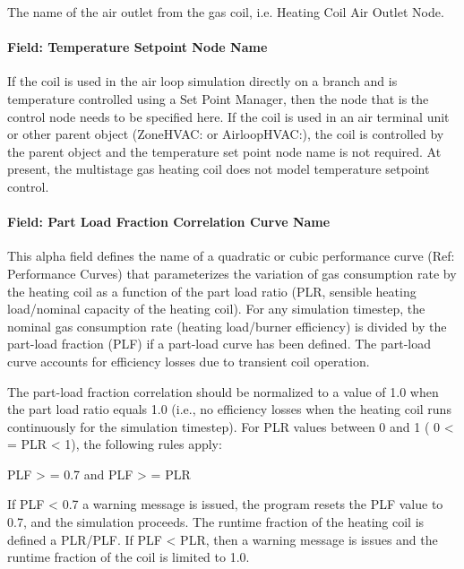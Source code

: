 The name of the air outlet from the gas coil, i.e. Heating Coil Air Outlet Node.

\paragraph{Field: Temperature Setpoint Node Name}\label{field-temperature-setpoint-node-name-5}

If the coil is used in the air loop simulation directly on a branch and is temperature controlled using a Set Point Manager, then the node that is the control node needs to be specified here. If the coil is used in an air terminal unit or other parent object (ZoneHVAC: or AirloopHVAC:), the coil is controlled by the parent object and the temperature set point node name is not required. At present, the multistage gas heating coil does not model temperature setpoint control.

\paragraph{Field: Part Load Fraction Correlation Curve Name}\label{field-part-load-fraction-correlation-curve-name-1}

This alpha field defines the name of a quadratic or cubic performance curve (Ref: Performance Curves) that parameterizes the variation of gas consumption rate by the heating coil as a function of the part load ratio (PLR, sensible heating load/nominal capacity of the heating coil). For any simulation timestep, the nominal gas consumption rate (heating load/burner efficiency) is divided by the part-load fraction (PLF) if a part-load curve has been defined. The part-load curve accounts for efficiency losses due to transient coil operation.

The part-load fraction correlation should be normalized to a value of 1.0 when the part load ratio equals 1.0 (i.e., no efficiency losses when the heating coil runs continuously for the simulation timestep). For PLR values between 0 and 1 ( 0 \textless{} = PLR \textless{} 1), the following rules apply:

PLF \textgreater{} = 0.7 and PLF \textgreater{} = PLR

If PLF \textless{} 0.7 a warning message is issued, the program resets the PLF value to 0.7, and the simulation proceeds. The runtime fraction of the heating coil is defined a PLR/PLF. If PLF \textless{} PLR, then a warning message is issues and the runtime fraction of the coil is limited to 1.0.

